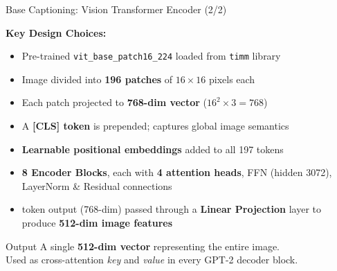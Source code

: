 \documentclass{beamer}
\begin{document}
\begin{frame}{Base Captioning: Vision Transformer Encoder (2/2)}

    \textbf{Key Design Choices:}\\[0.5em]
    \begin{itemize}
        \item Pre-trained \texttt{vit\_base\_patch16\_224} loaded from \texttt{timm} library
        \item Image divided into \textbf{196 patches} of $16\times16$ pixels each
        \item Each patch projected to \textbf{768-dim vector}
              \quad ($16^2 \times 3 = 768$)
        \item A \textbf{[CLS] token} is prepended; captures global image semantics
        \item \textbf{Learnable positional embeddings} added to all 197 tokens
        \item \textbf{8 Encoder Blocks}, each with \textbf{4 attention heads}, FFN (hidden 3072), LayerNorm \& Residual connections
        \item [CLS] token output (768-dim) passed through a \textbf{Linear Projection} layer to produce \textbf{512-dim image features}
    \end{itemize}

    \vspace{0.5cm}
    \begin{block}{Output}
        \centering
        A single \textbf{512-dim vector} representing the entire image.\\
        Used as cross-attention \textit{key} and \textit{value} in every GPT-2 decoder block.
    \end{block}

\end{frame}
\end{document}
